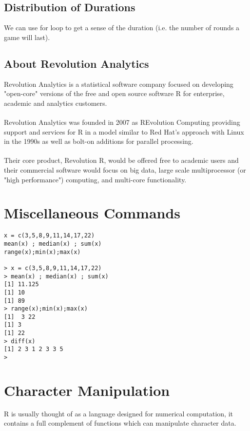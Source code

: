 \subsection{Distribution of Durations}
We can use for loop to get a sense of the duration (i.e. the number of rounds a game will last).






\subsection*{About Revolution Analytics}
Revolution Analytics is a statistical software company focused on developing "open-core" versions of the free and open source software R for enterprise, academic and analytics customers. 
\\
\\
\noindent Revolution Analytics was founded in 2007 as REvolution Computing providing support and services for R in a model similar to Red Hat's approach with Linux in the 1990s as well as bolt-on additions for parallel processing. 
\\
\\

\noindent Their core product, Revolution R, would be offered free to academic users and their commercial software would focus on big data, large scale multiprocessor (or "high performance") computing, and multi-core functionality.
\newpage
\section{Miscellaneous Commands}

\begin{framed}
\begin{verbatim}
x = c(3,5,8,9,11,14,17,22)
mean(x) ; median(x) ; sum(x)
range(x);min(x);max(x)

> x = c(3,5,8,9,11,14,17,22)
> mean(x) ; median(x) ; sum(x)
[1] 11.125
[1] 10
[1] 89
> range(x);min(x);max(x)
[1]  3 22
[1] 3
[1] 22
> diff(x)
[1] 2 3 1 2 3 3 5
> 
\end{verbatim}
\end{framed}




\section{Character Manipulation}
R is usually thought of as a language designed for numerical computation,
it contains a full complement of functions which can manipulate character
data.

